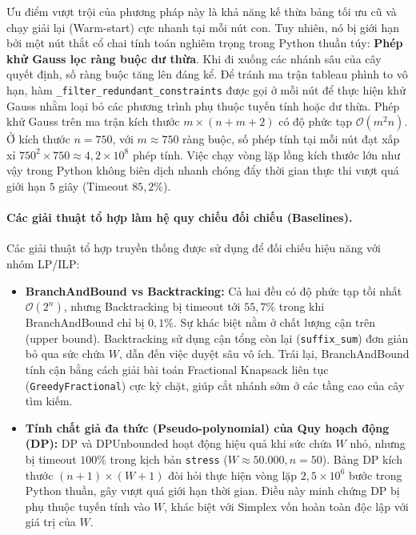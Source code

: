 \documentclass[fontsize=13pt,a4paper]{report}
\begin{document}
Ưu điểm vượt trội của phương pháp này là khả năng kế thừa bảng tối ưu cũ và chạy giải lại (Warm-start) cực nhanh tại mỗi nút con. Tuy nhiên, nó bị giới hạn bởi một nút thắt cổ chai tính toán nghiêm trọng trong Python thuần túy: \textbf{Phép khử Gauss lọc ràng buộc dư thừa}. Khi đi xuống các nhánh sâu của cây quyết định, số ràng buộc tăng lên đáng kể. Để tránh ma trận tableau phình to vô hạn, hàm \texttt{\_filter\_redundant\_constraints} được gọi ở mỗi nút để thực hiện khử Gauss nhằm loại bỏ các phương trình phụ thuộc tuyến tính hoặc dư thừa. Phép khử Gauss trên ma trận kích thước $m \times (n+m+2)$ có độ phức tạp $\mathcal{O}(m^2 n)$. Ở kích thước $n = 750$, với $m \approx 750$ ràng buộc, số phép tính tại mỗi nút đạt xấp xỉ $750^2 \times 750 \approx 4,2 \times 10^8$ phép tính. Việc chạy vòng lặp lồng kích thước lớn như vậy trong Python không biên dịch nhanh chóng đẩy thời gian thực thi vượt quá giới hạn $5$ giây (Timeout $85,2\%$).

\paragraph{Các giải thuật tổ hợp làm hệ quy chiếu đối chiếu (Baselines).}
Các giải thuật tổ hợp truyền thống được sử dụng để đối chiếu hiệu năng với nhóm LP/ILP:
\begin{itemize}[leftmargin=*]
    \item \textbf{BranchAndBound vs Backtracking:} Cả hai đều có độ phức tạp tồi nhất $\mathcal{O}(2^n)$, nhưng Backtracking bị timeout tới $55,7\%$ trong khi BranchAndBound chỉ bị $0,1\%$. Sự khác biệt nằm ở chất lượng cận trên (upper bound). Backtracking sử dụng cận tổng còn lại (\texttt{suffix\_sum}) đơn giản bỏ qua sức chứa $W$, dẫn đến việc duyệt sâu vô ích. Trái lại, BranchAndBound tính cận bằng cách giải bài toán Fractional Knapsack liên tục (\texttt{GreedyFractional}) cực kỳ chặt, giúp cắt nhánh sớm ở các tầng cao của cây tìm kiếm.
    \item \textbf{Tính chất giả đa thức (Pseudo-polynomial) của Quy hoạch động (DP):} DP và DPUnbounded hoạt động hiệu quả khi sức chứa $W$ nhỏ, nhưng bị timeout $100\%$ trong kịch bản \texttt{stress} ($W \approx 50.000, n = 50$). Bảng DP kích thước $(n+1) \times (W+1)$ đòi hỏi thực hiện vòng lặp $2,5 \times 10^6$ bước trong Python thuần, gây vượt quá giới hạn thời gian. Điều này minh chứng DP bị phụ thuộc tuyến tính vào $W$, khác biệt với Simplex vốn hoàn toàn độc lập với giá trị của $W$.
\end{itemize}
\end{document}
